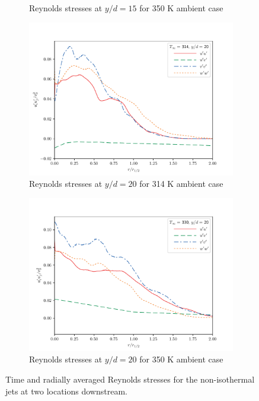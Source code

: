 \begin{figure}[H]
\begin{center}
\begin{subfigure}{0.45\textwidth}
	\caption{Reynolds stresses at $y/d=15$ for 350 K ambient case} \label{350_rey_15}
\end{subfigure}
\vfill
\begin{subfigure}{0.45\textwidth}
	\includegraphics[scale=.45]{figures/Plots/radial/slices_5/314_ambient/Rey_Stress_0_2.pdf}
	\caption{Reynolds stresses at $y/d=20$ for 314 K ambient case} \label{314_rey_20}
\end{subfigure}
\begin{subfigure}{0.45\textwidth}
	\includegraphics[scale=.45]{figures/Plots/radial/slices_5/same_ambient/Rey_Stress_0_2.pdf}
	\caption{Reynolds stresses at $y/d=20$ for 350 K ambient case} \label{350_rey_20}
\end{subfigure}
\caption{Time and radially averaged Reynolds stresses for the non-isothermal jets at two locations downstream.}
\label{noniso_reynolds_features}
\end{center}
\end{figure}


